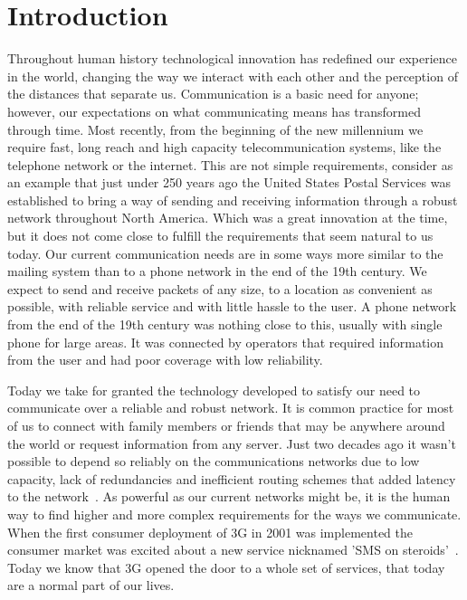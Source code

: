 \setcounter{equation}{0}
\chapter{Introduction}
  Throughout human history technological innovation has redefined our experience in the world, changing the way we interact with each other and the perception of the distances that separate us. Communication is a basic need for anyone; however, our expectations on what communicating means has transformed through time. Most recently, from the beginning of the new millennium we require fast, long reach and high capacity telecommunication systems, like  the telephone network or the internet. This are not simple requirements, consider as an example that just under 250 years ago the United States Postal Services was established to bring a way of sending and receiving information through a robust network throughout North America. Which was a great innovation at the time, but it does not come close to fulfill the requirements that seem natural to us today. Our current communication needs are in some ways more similar to the mailing system than to a phone network in the end of the 19th century. We expect to send and receive packets of any size, to a location as convenient as possible, with reliable service and with little hassle to the user. A phone network from the end of the 19th century was nothing close to this, usually with single phone for large areas. It was connected by operators that required information from the user and had poor coverage with low reliability.

Today we take for granted the technology developed to satisfy our need to communicate over a reliable and robust network.  It is common practice for most of us to connect with family members or friends that may be anywhere around the world or request information from any server. Just two decades ago it wasn't possible to depend so reliably on the communications networks due to low capacity, lack of redundancies and inefficient routing schemes that added latency to the network~\cite{HistoryCommunication}. As powerful as our current networks might be, it is the human way to find higher and more complex requirements for the ways we communicate. When the first consumer deployment of 3G in 2001 was implemented the consumer market was excited about a new service nicknamed 'SMS on steroids'~\cite{arvidsson2006brands}. Today we know that 3G opened the door to a whole set of services, that today are a normal part of our lives. 
        

